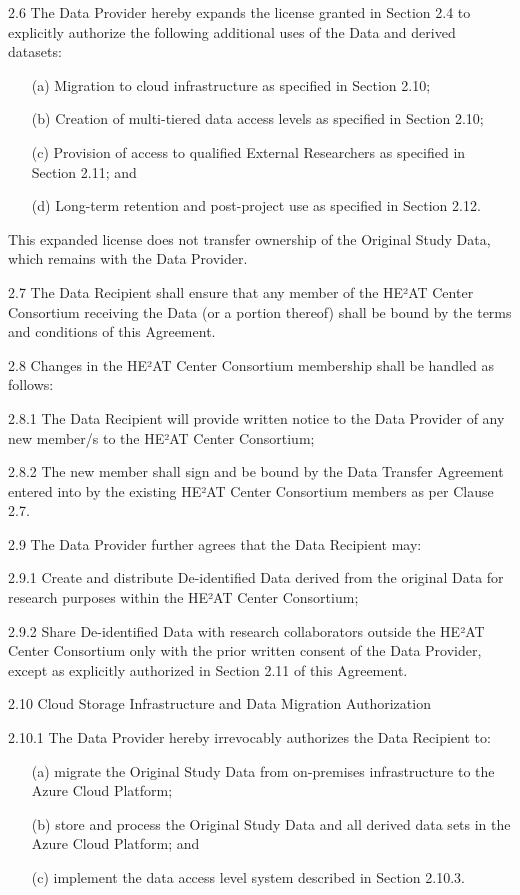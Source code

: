 \documentclass[12pt,letterpaper]{article}
\newcommand{\added}[1]{\textcolor{addcolor}{#1}}
\begin{document}
\added{2.6 The Data Provider hereby expands the license granted in Section 2.4 to explicitly authorize the following additional uses of the Data and derived datasets:

\begin{enumerate}
\item[(a)] Migration to cloud infrastructure as specified in Section 2.10;
\item[(b)] Creation of multi-tiered data access levels as specified in Section 2.10;
\item[(c)] Provision of access to qualified External Researchers as specified in Section 2.11; and
\item[(d)] Long-term retention and post-project use as specified in Section 2.12.
\end{enumerate}

This expanded license does not transfer ownership of the Original Study Data, which remains with the Data Provider.}

2.7 The Data Recipient shall ensure that any member of the HE²AT Center Consortium receiving the Data (or a portion thereof) shall be bound by the terms and conditions of this Agreement.

2.8 Changes in the HE²AT Center Consortium membership shall be handled as follows:

2.8.1 The Data Recipient will provide written notice to the Data Provider of any new member/s to the HE²AT Center Consortium;

2.8.2 The new member shall sign and be bound by the Data Transfer Agreement entered into by the existing HE²AT Center Consortium members as per Clause 2.7.

2.9 The Data Provider further agrees that the Data Recipient may:

2.9.1 Create and distribute De-identified Data derived from the original Data for research purposes within the HE²AT Center Consortium;

2.9.2 Share De-identified Data with research collaborators outside the HE²AT Center Consortium only with the prior written consent of the Data Provider, except as explicitly authorized in Section 2.11 of this Agreement.

\added{2.10 Cloud Storage Infrastructure and Data Migration Authorization}

\added{2.10.1 The Data Provider hereby irrevocably authorizes the Data Recipient to:
\begin{enumerate}
\item[(a)] migrate the Original Study Data from on-premises infrastructure to the Azure Cloud Platform;
\item[(b)] store and process the Original Study Data and all derived data sets in the Azure Cloud Platform; and
\item[(c)] implement the data access level system described in Section 2.10.3.
\end{enumerate}}
\end{document}
